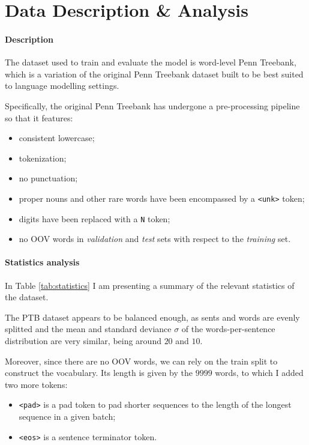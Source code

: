 \section{Data Description \& Analysis}
\label{sec:3_data}
\paragraph*{Description}
The dataset used to train and evaluate the model is word-level Penn Treebank, which is a variation of the original Penn Treebank dataset built to be best suited to language modelling settings. 

Specifically, the original Penn Treebank has undergone a pre-processing pipeline so that it features:

\begin{itemize}
    \item consistent lowercase;
    \item tokenization;
    \item no punctuation;
    \item proper nouns and other rare words have been encompassed by a \texttt{<unk>} token;
    \item digits have been replaced with a \texttt{N} token;
    \item no OOV words in \emph{validation} and \emph{test} sets with respect to the \emph{training} set.
\end{itemize}



\paragraph*{Statistics analysis}
In Table \ref{tab:statistics} I am presenting a summary of the relevant statistics of the dataset.

The PTB dataset appears to be balanced enough, as sents and words are evenly splitted and the mean and standard deviance \(\sigma\) of the words-per-sentence distribution are very similar, being around \(20\) and \(10\).

Moreover, since there are no OOV words, we can rely on the train split to construct the vocabulary. Its length is given by the \(9999\) words, to which I added two more tokens:
\begin{itemize}
    \item \texttt{<pad>} is a pad token to pad shorter sequences to the length of the longest sequence in a given batch;
    \item \texttt{<eos>} is a sentence terminator token.
\end{itemize}

